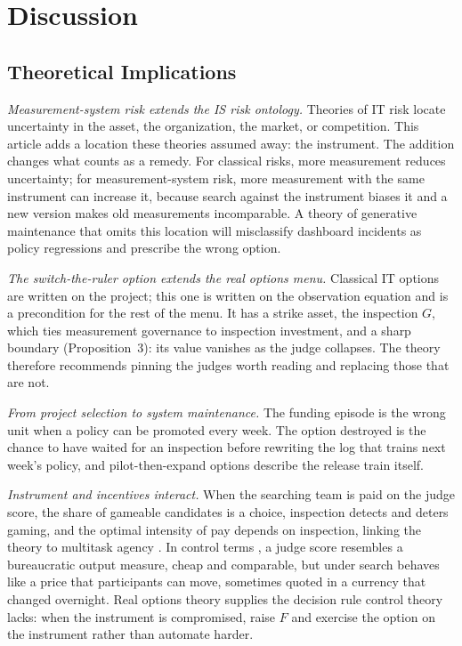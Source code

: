 \documentclass[acmsmall,screen,review]{acmart}
\theoremstyle{acmdefinition}
\begin{document}
\section{Discussion}\label{sec:discussion}

\subsection{Theoretical Implications}

\emph{Measurement-system risk extends the IS risk ontology.} Theories of IT risk locate uncertainty in the asset, the organization, the market, or competition. This article adds a location these theories assumed away: the instrument. The addition changes what counts as a remedy. For classical risks, more measurement reduces uncertainty; for measurement-system risk, more measurement with the same instrument can increase it, because search against the instrument biases it and a new version makes old measurements incomparable. A theory of generative maintenance that omits this location will misclassify dashboard incidents as policy regressions and prescribe the wrong option.

\emph{The switch-the-ruler option extends the real options menu.} Classical IT options are written on the project; this one is written on the observation equation and is a precondition for the rest of the menu. It has a strike asset, the inspection $G$, which ties measurement governance to inspection investment, and a sharp boundary (Proposition~3): its value vanishes as the judge collapses. The theory therefore recommends pinning the judges worth reading and replacing those that are not.

\emph{From project selection to system maintenance.} The funding episode is the wrong unit when a policy can be promoted every week. The option destroyed is the chance to have waited for an inspection before rewriting the log that trains next week's policy, and pilot-then-expand options describe the release train itself.

\emph{Instrument and incentives interact.} When the searching team is paid on the judge score, the share of gameable candidates is a choice, inspection detects and deters gaming, and the optimal intensity of pay depends on inspection, linking the theory to multitask agency \citep{holmstrom1991}. In control terms \citep{ouchi1979}, a judge score resembles a bureaucratic output measure, cheap and comparable, but under search behaves like a price that participants can move, sometimes quoted in a currency that changed overnight. Real options theory supplies the decision rule control theory lacks: when the instrument is compromised, raise $F$ and exercise the option on the instrument rather than automate harder.
\end{document}
